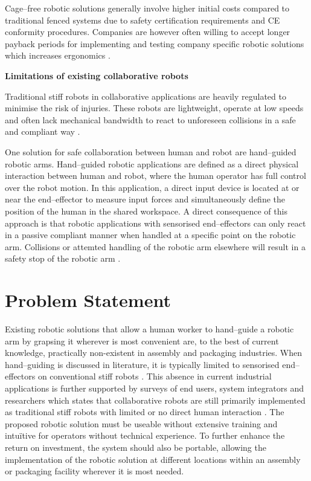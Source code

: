 \documentclass[11pt,a4paper,twoside,openright]{book}
\newcommand{\smalltitle}[1]{%
  \vspace{0.5cm}%
  \noindent\textbf{#1}%
  \vspace{0.2cm}%
  \par\noindent%
}
\begin{document}
Cage--free robotic solutions generally involve higher initial costs compared to traditional fenced systems due to safety certification requirements and CE conformity procedures. Companies are however often willing to accept longer payback periods for implementing and testing company specific robotic solutions which increases ergonomics \cite{benderLightweightRobotsManual2016}.

\smalltitle{Limitations of existing collaborative robots}
Traditional stiff robots in collaborative applications are heavily regulated to minimise the risk of injuries. These robots are lightweight, operate at low speeds and  often lack mechanical bandwidth to react to unforeseen collisions in a safe and compliant way \cite{benderLightweightRobotsManual2016}\cite[Chapters~54 and~57]{sicilianoSpringerHandbookRobotics2016}.  

One solution for safe collaboration between human and robot are hand--guided robotic arms. Hand--guided robotic applications are defined as a direct physical interaction  between human and robot, where the human operator has full control over the robot motion. In this application, a direct input device is located at or near the end--effector to measure input forces and simultaneously define the position of the human in the shared workspace. A direct consequence of this approach is that robotic applications with sensorised end--effectors can only react in a passive compliant manner when handled at a specific point on the robotic arm. Collisions or attemted handling of the robotic arm elsewhere will result in a safety stop of the robotic arm \cite[Chapters~54 and~57]{sicilianoSpringerHandbookRobotics2016}.

\newpage
\section{Problem Statement}

Existing robotic solutions that allow a human worker to hand--guide a robotic arm by grapsing it wherever is most convenient are, to the best of current knowledge, practically non-existent in assembly and packaging industries. When hand--guiding is discussed in literature, it is typically limited to sensorised end--effectors on conventional stiff robots \cite{gregorHandGuidingVirtual2021}\cite{hameedControlSystemDesign2023}.
This absence in current industrial applications is further supported by surveys of end users, system integrators and researchers which states that collaborative robots are still primarily implemented as traditional stiff robots with limited or no direct human interaction \cite{montiniCollaborativeRoboticsSurvey2024}.
The proposed robotic solution must be useable without extensive training and intuïtive for operators without technical experience. To further enhance the return on investment, the system should also be portable, allowing the implementation of the robotic solution at different locations within an assembly or packaging facility wherever it is most needed.
\end{document}
